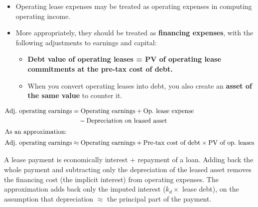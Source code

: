 \begin{itemize}
  \item Operating lease expenses may be treated as operating expenses in computing operating income.
  \item More appropriately, they should be treated as \textbf{financing expenses}, with the following adjustments to earnings and capital:
  \begin{itemize}
    \item \textbf{Debt value of operating leases = PV of operating lease commitments at the pre-tax cost of debt.}
    \item When you convert operating leases into debt, you also create an \textbf{asset of the same value} to counter it.
  \end{itemize}
\end{itemize}

\begin{keybox}
\begin{align*}
\text{Adj.\ operating earnings} &= \text{Operating earnings} + \text{Op.\ lease expense}\\
&\quad - \text{Depreciation on leased asset}\\
\intertext{As an approximation:}
\text{Adj.\ operating earnings} &\approx \text{Operating earnings} + \text{Pre-tax cost of debt}\times\text{PV of op.\ leases}
\end{align*}
\end{keybox}

\begin{addbox}
A lease payment is economically interest + repayment of a loan. Adding back the whole payment and subtracting only the depreciation of the leased asset removes the financing cost (the implicit interest) from operating expenses. The approximation adds back only the imputed interest ($k_d\times$ lease debt), on the assumption that depreciation $\approx$ the principal part of the payment.
\end{addbox}

